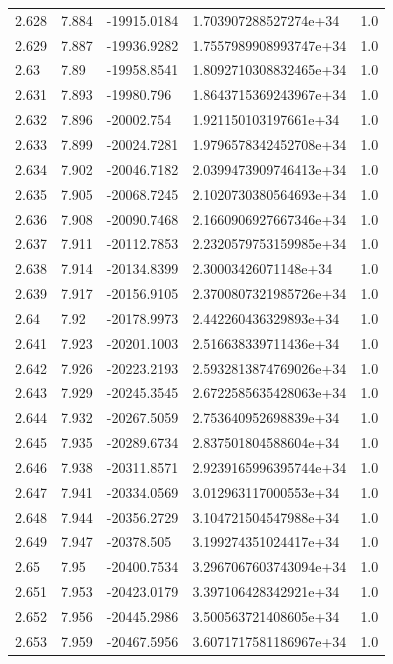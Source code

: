 \begin{tabular}{lllll}
2.628 & 7.884 & -19915.0184 & 1.703907288527274e+34 & 1.0 \\
2.629 & 7.887 & -19936.9282 & 1.7557989908993747e+34 & 1.0 \\
2.63 & 7.89 & -19958.8541 & 1.8092710308832465e+34 & 1.0 \\
2.631 & 7.893 & -19980.796 & 1.8643715369243967e+34 & 1.0 \\
2.632 & 7.896 & -20002.754 & 1.921150103197661e+34 & 1.0 \\
2.633 & 7.899 & -20024.7281 & 1.9796578342452708e+34 & 1.0 \\
2.634 & 7.902 & -20046.7182 & 2.0399473909746413e+34 & 1.0 \\
2.635 & 7.905 & -20068.7245 & 2.1020730380564693e+34 & 1.0 \\
2.636 & 7.908 & -20090.7468 & 2.1660906927667346e+34 & 1.0 \\
2.637 & 7.911 & -20112.7853 & 2.2320579753159985e+34 & 1.0 \\
2.638 & 7.914 & -20134.8399 & 2.30003426071148e+34 & 1.0 \\
2.639 & 7.917 & -20156.9105 & 2.3700807321985726e+34 & 1.0 \\
2.64 & 7.92 & -20178.9973 & 2.442260436329893e+34 & 1.0 \\
2.641 & 7.923 & -20201.1003 & 2.516638339711436e+34 & 1.0 \\
2.642 & 7.926 & -20223.2193 & 2.5932813874769026e+34 & 1.0 \\
2.643 & 7.929 & -20245.3545 & 2.6722585635428063e+34 & 1.0 \\
2.644 & 7.932 & -20267.5059 & 2.753640952698839e+34 & 1.0 \\
2.645 & 7.935 & -20289.6734 & 2.837501804588604e+34 & 1.0 \\
2.646 & 7.938 & -20311.8571 & 2.9239165996395744e+34 & 1.0 \\
2.647 & 7.941 & -20334.0569 & 3.012963117000553e+34 & 1.0 \\
2.648 & 7.944 & -20356.2729 & 3.104721504547988e+34 & 1.0 \\
2.649 & 7.947 & -20378.505 & 3.199274351024417e+34 & 1.0 \\
2.65 & 7.95 & -20400.7534 & 3.2967067603743094e+34 & 1.0 \\
2.651 & 7.953 & -20423.0179 & 3.397106428342921e+34 & 1.0 \\
2.652 & 7.956 & -20445.2986 & 3.500563721408605e+34 & 1.0 \\
2.653 & 7.959 & -20467.5956 & 3.6071717581186967e+34 & 1.0 \\

\end{tabular}
